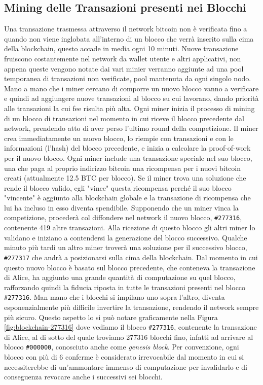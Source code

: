 \subsection*{Mining delle Transazioni presenti nei Blocchi}
Una transazione trasmessa attraverso il network bitcoin non è verificata fino a quando non viene inglobata all'interno di un blocco che verrà inserito sulla cima della blockchain, questo accade in media ogni 10 minuti. Nuove transazione fruiscono costantemente nel network da wallet utente e altri applicativi, non appena queste vengono notate dai vari minier verranno aggiunte ad una pool temporanea di transazioni non verificate, pool mantenuta da ogni singolo nodo. Mano a mano che i miner cercano di comporre un nuovo blocco vanno a verificare e quindi ad aggiungere nuove transazioni al blocco su cui lavorano, dando priorità alle transazioni la cui fee risulta più alta. Ogni miner inizia il processo di mining di un blocco di transazioni nel momento in cui riceve il blocco precedente dal network, prendendo atto di aver perso l'ultimo round della competizione. Il miner crea immediatamente un nuovo blocco, lo riempie con transazioni e con le informazioni (l'hash) del blocco precedente, e inizia a calcolare la proof-of-work per il nuovo blocco. Ogni miner include una transazione speciale nel suo blocco, una che paga al proprio indirizzo bitcoin una ricompensa per i nuovi bitcoin creati (attualmente 12.5 BTC per blocco). Se il miner trova una soluzione che rende il blocco valido, egli "vince" questa ricompensa perché il suo blocco "vincente" è aggiunto alla blockchain globale e la transazione di ricompensa che lui ha incluso in esso diventa spendibile. Supponendo che un miner vinca la competizione, procederà col diffondere nel network il nuovo blocco, \texttt{\#277316}, contenente 419 altre transazioni. Alla ricezione di questo blocco gli altri miner lo validano e iniziano a contendersi la generazione del blocco successivo. Qualche minuto più tardi un altro miner troverà una soluzione per il successivo blocco, \texttt{\#277317} che andrà a posizionarsi sulla cima della blockchain. Dal momento in cui questo nuovo blocco è basato sul blocco precedente, che conteneva la transazione di Alice, ha aggiunto una grande quantità di computazione su quel blocco, rafforzando quindi la fiducia riposta in tutte le transazioni presenti nel blocco \texttt{\#277316}. Man mano che i blocchi si impilano uno sopra l'altro, diventa esponenzialmente più difficile invertire la transazione, rendendo il network sempre più sicuro. Questo aspetto lo si può notare graficamente nella Figura \ref{fig:blockchain-277316} dove vediamo il blocco \texttt{\#277316}, contenente la transazione di Alice, al di sotto del quale troviamo 277316 blocchi fino, infatti ad arrivare al blocco \texttt{\#000000}, conosciuto anche come \textit{genesis block}. Per convenzione, ogni blocco con più di 6 conferme è considerato irrevocabile dal momento in cui si necessiterebbe di un'ammontare immenso di computazione per invalidarlo e di conseguenza revocare anche i successivi sei blocchi.
